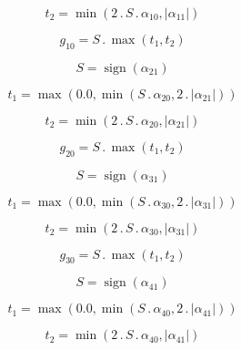 \documentclass{article}
\begin{document}
\begin{dmath}t_{2} = \min\left(2 \,.\, S \,.\, \alpha_{10}, \left|{\alpha_{11}}\right|\right)\end{dmath}

\begin{dmath}g_{10} = S \,.\, \max\left(t_{1}, t_{2}\right)\end{dmath}

\begin{dmath}S = \operatorname{sign}{\left (\alpha_{21} \right )}\end{dmath}

\begin{dmath}t_{1} = \max\left(0.0, \min\left(S \,.\, \alpha_{20}, 2 \,.\, \left|{\alpha_{21}}\right|\right)\right)\end{dmath}

\begin{dmath}t_{2} = \min\left(2 \,.\, S \,.\, \alpha_{20}, \left|{\alpha_{21}}\right|\right)\end{dmath}

\begin{dmath}g_{20} = S \,.\, \max\left(t_{1}, t_{2}\right)\end{dmath}

\begin{dmath}S = \operatorname{sign}{\left (\alpha_{31} \right )}\end{dmath}

\begin{dmath}t_{1} = \max\left(0.0, \min\left(S \,.\, \alpha_{30}, 2 \,.\, \left|{\alpha_{31}}\right|\right)\right)\end{dmath}

\begin{dmath}t_{2} = \min\left(2 \,.\, S \,.\, \alpha_{30}, \left|{\alpha_{31}}\right|\right)\end{dmath}

\begin{dmath}g_{30} = S \,.\, \max\left(t_{1}, t_{2}\right)\end{dmath}

\begin{dmath}S = \operatorname{sign}{\left (\alpha_{41} \right )}\end{dmath}

\begin{dmath}t_{1} = \max\left(0.0, \min\left(S \,.\, \alpha_{40}, 2 \,.\, \left|{\alpha_{41}}\right|\right)\right)\end{dmath}

\begin{dmath}t_{2} = \min\left(2 \,.\, S \,.\, \alpha_{40}, \left|{\alpha_{41}}\right|\right)\end{dmath}
\end{document}
